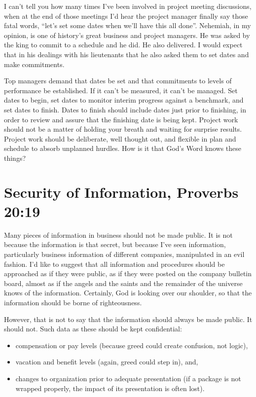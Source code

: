 \documentclass[12pt]{memoir}
\begin{document}
I can't tell you how many times I've been involved in project meeting
discussions, when at the end of those meetings I'd hear the project
manager finally say those fatal words, ``let's set some dates when
we'll have this all done''. Nehemiah, in my opinion, is one of history's great business and project managers. He was asked by the king to commit to a schedule and he did. He also delivered. I would expect that in his dealings with his lieutenants that he also asked them to set dates and make commitments.

Top managers demand that dates be set and that commitments to levels
of performance be established. If it can't be measured, it can't
be managed. Set dates to begin, set dates to monitor interim progress
against a benchmark, and set dates to finish. Dates to finish should
include dates just prior to finishing, in order to review and assure that the
finishing date is being kept. Project work should not be a matter
of holding your breath and waiting for surprise results. Project
work should be deliberate, well thought out, and flexible in plan
and schedule to absorb unplanned hurdles. How is it that God's Word
knows these things?

\section[Security of Information]{Security of Information, Proverbs 20:19}

Many pieces of information in business should not be made public.
It is not because the information is that secret, but because I've
seen information, particularly business information of different companies,
manipulated in an evil fashion. I'd like to suggest that all
information and procedures should be approached as if they were public,
as if they were posted on the company bulletin board, almost as if the angels and the saints and the remainder of the universe knows of the information. Certainly, God is looking over our shoulder, so that the information should be borne of righteousness.

However, that is not to say that the information should always be
made public. It should not. Such data as these should be kept confidential:

\begin{itemize}
\item compensation or pay levels (because greed could create confusion, not logic),

\item  vacation and benefit levels (again, greed could step in), and,

\item changes to organization prior to adequate presentation (if a package is not wrapped properly, the impact of its presentation is often lost).
\end{itemize}
\end{document}
